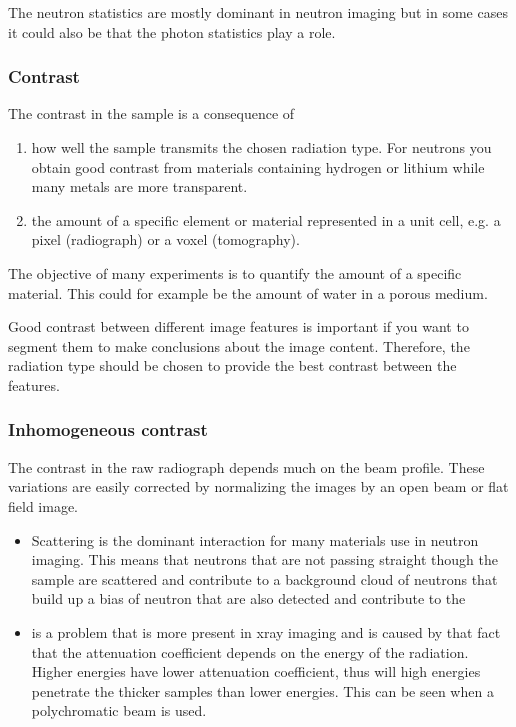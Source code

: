 \documentclass[letterpaper,10pt,english]{sphinxmanual}
\begin{document}
The neutron statistics are mostly dominant in neutron imaging but in some cases it could also be that the photon statistics play a role.


\subsubsection{Contrast}
\label{\detokenize{ML4NeutronImageSegmentation:contrast}}
The contrast in the sample is a consequence of
\begin{enumerate}
%
\item {} 
how well the sample transmits the chosen radiation type. For neutrons you obtain good contrast from materials containing hydrogen or lithium while many metals are more transparent.

\item {} 
the amount of a specific element or material represented in a unit cell, e.g. a pixel (radiograph) or a voxel (tomography).

\end{enumerate}

The objective of many experiments is to quantify the amount of a specific material. This could for example be the amount of water in a porous medium.

Good contrast between different image features is important if you want to segment them to make conclusions about the image content. Therefore, the radiation type should be chosen to provide the best contrast between the features.


\subsubsection{Inhomogeneous contrast}
\label{\detokenize{ML4NeutronImageSegmentation:inhomogeneous-contrast}}
The contrast in the raw radiograph depends much on the beam profile. These variations are easily corrected by normalizing the images by an open beam or flat field image.
\begin{itemize}
\item {} 
 Scattering is the dominant interaction for many materials use in neutron imaging. This means that neutrons that are not passing straight though the sample are scattered and contribute to a background cloud of neutrons that build up a bias of neutron that are also detected and contribute to the

\item {} 
 is a problem that is more present in x\sphinxhyphen{}ray imaging and is caused by that fact that the attenuation coefficient depends on the energy of the radiation. Higher energies have lower attenuation coefficient, thus will high energies penetrate the thicker samples than lower energies. This can be seen when a polychromatic beam is used.

\end{itemize}
\end{document}
